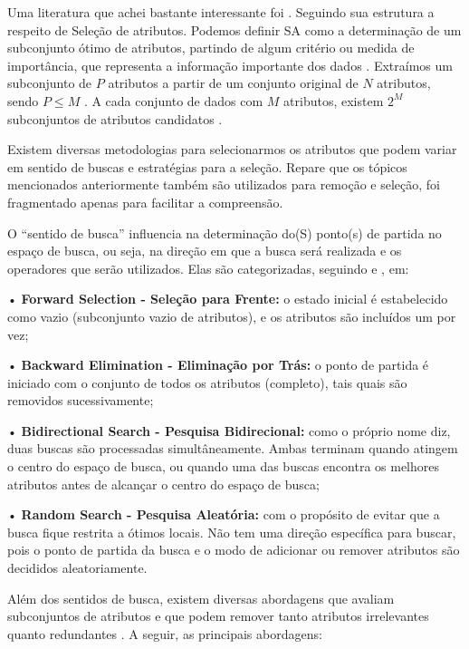 \documentclass[
]{book}
\begin{document}
Uma literatura que achei bastante interessante foi \citet{parmezan2012avaliaccao}. Seguindo sua estrutura a respeito de Seleção de atributos. Podemos definir SA como a determinação de um subconjunto ótimo de atributos, partindo de algum critério ou medida de importância, que representa a informação importante dos dados \citep{parmezan2012avaliaccao}. Extraímos um subconjunto de \(P\) atributos a partir de um conjunto original de \(N\) atributos, sendo \(P\leq M\) \citep{parmezan2012avaliaccao, liu1998feature, lee2005seleccao}. A cada conjunto de dados com \(M\) atributos, existem \(2^M\) subconjuntos de atributos candidatos \citep{langley1994selection}.

Existem diversas metodologias para selecionarmos os atributos que podem variar em sentido de buscas e estratégias para a seleção. Repare que os tópicos mencionados anteriormente também são utilizados para remoção e seleção, foi fragmentado apenas para facilitar a compreensão.

O ``sentido de busca'' influencia na determinação do(S) ponto(s) de partida no espaço de busca, ou seja, na direção em que a busca será realizada e os operadores que serão utilizados. Elas são categorizadas, seguindo \citet{parmezan2012avaliaccao} e \citet{liu2008computational}, em:

• \textbf{Forward Selection - Seleção para Frente:} o estado inicial é estabelecido como vazio (subconjunto vazio de atributos), e os atributos são incluídos um por vez;

• \textbf{Backward Elimination - Eliminação por Trás:} o ponto de partida é iniciado com o conjunto de todos os atributos (completo), tais quais são removidos sucessivamente;

• \textbf{Bidirectional Search - Pesquisa Bidirecional:} como o próprio nome diz, duas buscas são processadas simultâneamente. Ambas terminam quando atingem o centro do espaço de busca, ou quando uma das buscas encontra os melhores atributos antes de alcançar o centro do espaço de busca;

• \textbf{Random Search - Pesquisa Aleatória:} com o propósito de evitar que a busca fique restrita a ótimos locais. Não tem uma direção específica para buscar, pois o ponto de partida da busca e o modo de adicionar ou remover atributos são decididos aleatoriamente.

Além dos sentidos de busca, existem diversas abordagens que avaliam subconjuntos de atributos e que podem remover tanto atributos irrelevantes quanto redundantes \citep{parmezan2012avaliaccao, liu2008computational}. A seguir, as principais abordagens:
\end{document}
